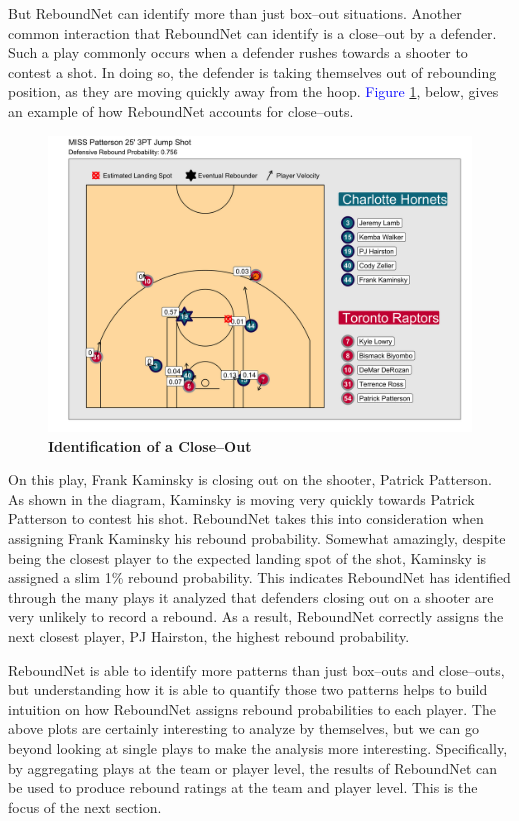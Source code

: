 \documentclass{article}
\begin{document}
\bigbreak
\noindent
But ReboundNet can identify more than just box--out situations. Another common interaction that ReboundNet can identify is a close--out by a defender. Such a play commonly occurs when a defender rushes towards a shooter to contest a shot. In doing so, the defender is taking themselves out of rebounding position, as they are moving quickly away from the hoop. \textcolor{blue}{Figure} \ref{fig:SpeedEx}, below, gives an example of how ReboundNet accounts for close--outs. 

\clearpage

\begin{figure}[htb]
\centering
\includegraphics[width=1\columnwidth]{SpeedEx.png}
\caption{\bf{Identification of a Close--Out}}
\label{fig:SpeedEx}
\end{figure}

\noindent
On this play, Frank Kaminsky is closing out on the shooter, Patrick Patterson. As shown in the diagram, Kaminsky is moving very quickly towards Patrick Patterson to contest his shot. ReboundNet takes this into consideration when assigning Frank Kaminsky his rebound probability. Somewhat amazingly, despite being the closest player to the expected landing spot of the shot, Kaminsky is assigned a slim 1\% rebound probability. This indicates ReboundNet has identified through the many plays it analyzed that defenders closing out on a shooter are very unlikely to record a rebound. As a result, ReboundNet correctly assigns the next closest player, PJ Hairston, the highest rebound probability.

\bigbreak
\noindent
ReboundNet is able to identify more patterns than just box--outs and close--outs, but understanding how it is able to quantify those two patterns helps to build intuition on how ReboundNet assigns rebound probabilities to each player. The above plots are certainly interesting to analyze by themselves, but we can go beyond looking at single plays to make the analysis more interesting. Specifically, by aggregating plays at the team or player level, the results of ReboundNet can be used to produce rebound ratings at the team and player level. This is the focus of the next section.
\end{document}
